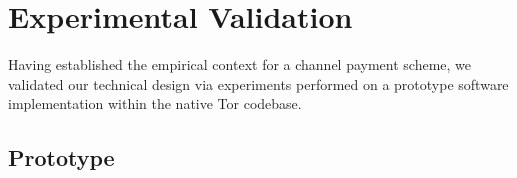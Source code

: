 
\section{Experimental Validation}
\label{sec:experimentations}

Having established the empirical context for a channel payment scheme, we
validated our technical design via experiments performed on a prototype
software implementation within the native Tor codebase.

\subsection{Prototype}

